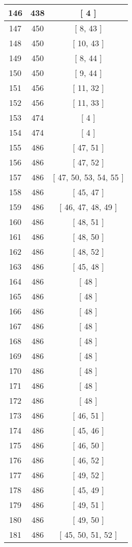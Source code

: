 \begin{center}
\begin{longtable}[H]{|| c c c ||}
\hline
146 & 438 & [ 4 ] \\ 
\hline
147 & 450 & [ 8, 43 ] \\ 
\hline
148 & 450 & [ 10, 43 ] \\ 
\hline
149 & 450 & [ 8, 44 ] \\ 
\hline
150 & 450 & [ 9, 44 ] \\ 
\hline
151 & 456 & [ 11, 32 ] \\ 
\hline
152 & 456 & [ 11, 33 ] \\ 
\hline
153 & 474 & [ 4 ] \\ 
\hline
154 & 474 & [ 4 ] \\ 
\hline
155 & 486 & [ 47, 51 ] \\ 
\hline
156 & 486 & [ 47, 52 ] \\ 
\hline
157 & 486 & [ 47, 50, 53, 54, 55 ] \\ 
\hline
158 & 486 & [ 45, 47 ] \\ 
\hline
159 & 486 & [ 46, 47, 48, 49 ] \\ 
\hline
160 & 486 & [ 48, 51 ] \\ 
\hline
161 & 486 & [ 48, 50 ] \\ 
\hline
162 & 486 & [ 48, 52 ] \\ 
\hline
163 & 486 & [ 45, 48 ] \\ 
\hline
164 & 486 & [ 48 ] \\ 
\hline
165 & 486 & [ 48 ] \\ 
\hline
166 & 486 & [ 48 ] \\ 
\hline
167 & 486 & [ 48 ] \\ 
\hline
168 & 486 & [ 48 ] \\ 
\hline
169 & 486 & [ 48 ] \\ 
\hline
170 & 486 & [ 48 ] \\ 
\hline
171 & 486 & [ 48 ] \\ 
\hline
172 & 486 & [ 48 ] \\ 
\hline
173 & 486 & [ 46, 51 ] \\ 
\hline
174 & 486 & [ 45, 46 ] \\ 
\hline
175 & 486 & [ 46, 50 ] \\ 
\hline
176 & 486 & [ 46, 52 ] \\ 
\hline
177 & 486 & [ 49, 52 ] \\ 
\hline
178 & 486 & [ 45, 49 ] \\ 
\hline
179 & 486 & [ 49, 51 ] \\ 
\hline
180 & 486 & [ 49, 50 ] \\ 
\hline
181 & 486 & [ 45, 50, 51, 52 ] \\ 

\end{longtable}
\end{center}
